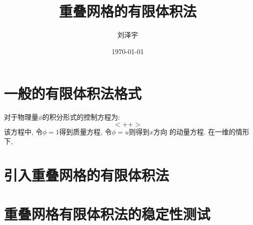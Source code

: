 \documentclass[hyperref,UTF8,adobefonts,titlepage]{ctexart}
\title{重叠网格的有限体积法}
\author{刘泽宇}
\date{\today}
\begin{document}
\maketitle

\section{一般的有限体积法格式}
对于物理量$\phi$的积分形式的控制方程为:
\begin{equation}
	<++>
	\label{equ:1}
\end{equation}
该方程中, 令$\phi=1$得到质量方程, 令$\phi=u$则得到$x$方向
的动量方程. 在一维的情形下,

\section{引入重叠网格的有限体积法}

\section{重叠网格有限体积法的稳定性测试}

%
\end{document}
